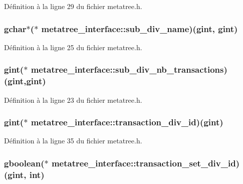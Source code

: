 Définition à la ligne 29 du fichier metatree.h.

\subsubsection[{sub\_\-div\_\-name}]{\setlength{\rightskip}{0pt plus 5cm}gchar$\ast$($\ast$  {\bf metatree\_\-interface::sub\_\-div\_\-name})(gint, gint)}\label{structmetatree__interface_ad5126f6ad091ba08666844a6e082b92c}


Définition à la ligne 25 du fichier metatree.h.

\subsubsection[{sub\_\-div\_\-nb\_\-transactions}]{\setlength{\rightskip}{0pt plus 5cm}gint($\ast$  {\bf metatree\_\-interface::sub\_\-div\_\-nb\_\-transactions})(gint,gint)}\label{structmetatree__interface_ab8ded2fa7527cee822f8210f82ea11a2}


Définition à la ligne 23 du fichier metatree.h.

\subsubsection[{transaction\_\-div\_\-id}]{\setlength{\rightskip}{0pt plus 5cm}gint($\ast$  {\bf metatree\_\-interface::transaction\_\-div\_\-id})(gint)}\label{structmetatree__interface_a5cac668f9945ead5b4254c4f80b99266}


Définition à la ligne 35 du fichier metatree.h.

\subsubsection[{transaction\_\-set\_\-div\_\-id}]{\setlength{\rightskip}{0pt plus 5cm}gboolean($\ast$  {\bf metatree\_\-interface::transaction\_\-set\_\-div\_\-id})(gint, int)}\label{structmetatree__interface_a74107bfb0474039c0dcf8cc27bfbd7b7}


